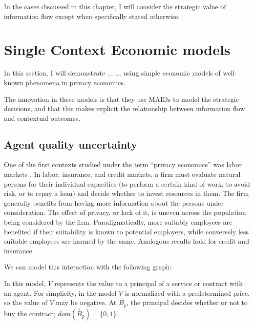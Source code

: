 \documentclass[../thesis.tex]{subfiles}
\begin{document}
In the cases discussed in this chapter, I will consider
the strategic value of information flow except when specifically
stated otherwise.

\section{Single Context Economic models}
\label{sec:single-context}

In this section, I will demonstrate ...
... using simple economic models of well-known
phenomena in privacy economics.

The innovation in these models is that they
use MAIDs to model the strategic decisions,
and that this makes explicit the relationship
between information flow and contextual outcomes.

\subsection{Agent quality uncertainty}
\label{sec:agent-quality}

One of the first contexts studied under the
term ``privacy economics'' was labor
markets \cite{posner1981economics}.
In labor, insurance, and credit markets,
a firm must evaluate natural persons
for their individual capacities (to perform a certain kind
of work, to avoid risk, or to repay a loan) and decide
whether to invest resources in them.
The firm generally benefits from having more information
about the persons under consideration.
The effect of privacy, or lack of it, is uneven across
the population being considered by the firm.
Paradigmatically, more suitably employees are benefited
if their suitability is known to potential employers,
while conversely less suitable employees are harmed
by the same.
Analogous results hold for credit and insurance.

We can model this interaction with the following graph:

\begin{center}
\end{center}

In this model, $V$ represents the value to a principal
of a service or contract with an agent.
For simplicity, in the model $V$ is normalized
with a predetermined price, so the value of $V$
may be negative.
At $\tilde{B_p}$, the principal decides whether or not to buy
the contract; $dom(\tilde{B_p}) = \{0,1\}$.
\end{document}
